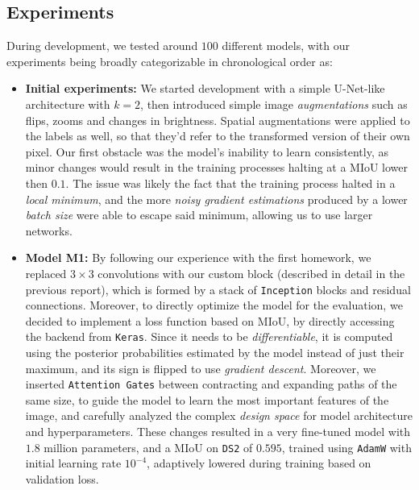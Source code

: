 \documentclass[11pt]{article}
\begin{document}
\begin{multicols}{2}
      \section{Experiments}
      \label{sec:experiments}
      During development, we tested around $100$ different models, with our experiments being broadly categorizable in chronological order as:
      \begin{itemize}[leftmargin=*]
            \setlength\itemsep{0em}
            \item \textbf{Initial experiments:} We started development with a simple U-Net-like architecture with $k=2$, then introduced simple image \textit{augmentations} such as flips, zooms and changes in brightness. Spatial augmentations were applied to the labels as well, so that they'd refer to the transformed version of their own pixel. Our first obstacle was the model's inability to learn consistently, as minor changes would result in the training processes halting at a MIoU lower then $0.1$. The issue was likely the fact that the training process halted in a \textit{local minimum}, and the more \textit{noisy gradient estimations} produced by a lower \textit{batch size} were able to escape said minimum, allowing us to use larger networks.
            \item \textbf{Model M1:} By following our experience with the first homework, we replaced $3\times3$ convolutions with our custom block (described in detail in the previous report), which is formed by a stack of \texttt{Inception} blocks and residual connections. Moreover, to directly optimize the model for the evaluation, we decided to implement a loss function based on MIoU, by directly accessing the backend from \texttt{Keras}. Since it needs to be \textit{differentiable}, it is computed using the posterior probabilities estimated by the model instead of just their maximum, and its sign is flipped to use \textit{gradient descent}. Moreover, we inserted \texttt{Attention Gates}\cite{oktay2018attentionunetlearninglook} between contracting and expanding paths of the same size, to guide the model to learn the most important features of the image, and carefully analyzed the complex \textit{design space} for model architecture and hyperparameters. These changes resulted in a very fine-tuned model with $1.8$ million parameters, and a MIoU on \texttt{DS2} of $0.595$, trained using \texttt{AdamW} with initial learning rate $10^{-4}$, adaptively lowered during training based on validation loss.

\end{itemize}
\end{multicols}
\end{document}
